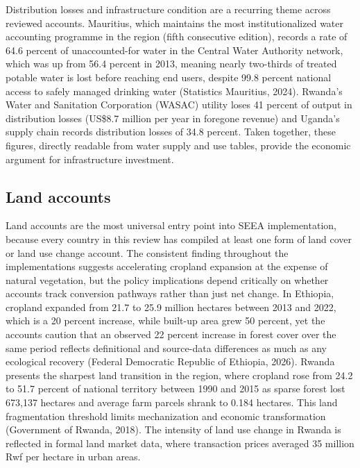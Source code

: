 \documentclass[
  letterpaper,
  DIV=11,
  numbers=noendperiod]{scrartcl}
\begin{document}
Distribution losses and infrastructure condition are a recurring theme
across reviewed accounts. Mauritius, which maintains the most
institutionalized water accounting programme in the region (fifth
consecutive edition), records a rate of 64.6 percent of unaccounted-for
water in the Central Water Authority network, which was up from 56.4
percent in 2013, meaning nearly two-thirds of treated potable water is
lost before reaching end users, despite 99.8 percent national access to
safely managed drinking water (Statistics Mauritius, 2024). Rwanda's
Water and Sanitation Corporation (WASAC) utility loses 41 percent of
output in distribution losses (US\$8.7 million per year in foregone
revenue) and Uganda's supply chain records distribution losses of 34.8
percent. Taken together, these figures, directly readable from water
supply and use tables, provide the economic argument for infrastructure
investment.

\subsection{Land accounts}\label{land-accounts}

Land accounts are the most universal entry point into SEEA
implementation, because every country in this review has compiled at
least one form of land cover or land use change account. The consistent
finding throughout the implementations suggests accelerating cropland
expansion at the expense of natural vegetation, but the policy
implications depend critically on whether accounts track conversion
pathways rather than just net change. In Ethiopia, cropland expanded
from 21.7 to 25.9 million hectares between 2013 and 2022, which is a 20
percent increase, while built-up area grew 50 percent, yet the accounts
caution that an observed 22 percent increase in forest cover over the
same period reflects definitional and source-data differences as much as
any ecological recovery (Federal Democratic Republic of Ethiopia, 2026).
Rwanda presents the sharpest land transition in the region, where
cropland rose from 24.2 to 51.7 percent of national territory between
1990 and 2015 as sparse forest lost 673,137 hectares and average farm
parcels shrank to 0.184 hectares. This land fragmentation threshold
limits mechanization and economic transformation (Government of Rwanda,
2018). The intensity of land use change in Rwanda is reflected in formal
land market data, where transaction prices averaged 35 million Rwf per
hectare in urban areas.
\end{document}
